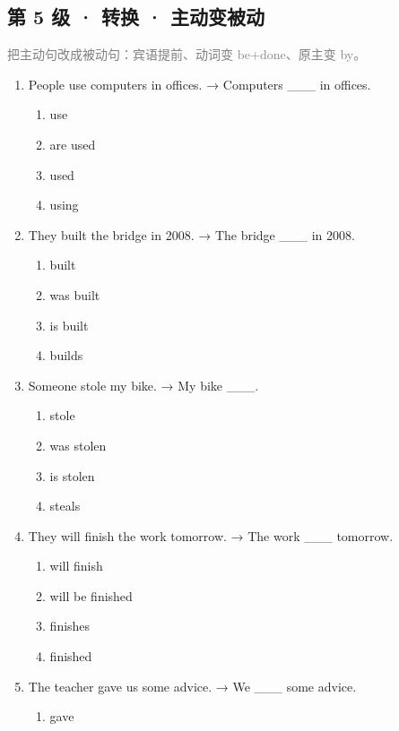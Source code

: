 \documentclass[11pt,a4paper]{ctexart}
\begin{document}
\subsection*{第 5 级 · 转换 · 主动变被动}
\noindent\textcolor{gray}{把主动句改成被动句：宾语提前、动词变 be+done、原主变 by。}\par\smallskip
\begin{enumerate}[leftmargin=*,itemsep=4pt]
\item People use computers in offices. → Computers \_\_\_ in offices.
\begin{enumerate}[label=\Alph*.,leftmargin=2em,itemsep=1pt,topsep=2pt]
\item use
\item are used
\item used
\item using
\end{enumerate}
\item They built the bridge in 2008. → The bridge \_\_\_ in 2008.
\begin{enumerate}[label=\Alph*.,leftmargin=2em,itemsep=1pt,topsep=2pt]
\item built
\item was built
\item is built
\item builds
\end{enumerate}
\item Someone stole my bike. → My bike \_\_\_.
\begin{enumerate}[label=\Alph*.,leftmargin=2em,itemsep=1pt,topsep=2pt]
\item stole
\item was stolen
\item is stolen
\item steals
\end{enumerate}
\item They will finish the work tomorrow. → The work \_\_\_ tomorrow.
\begin{enumerate}[label=\Alph*.,leftmargin=2em,itemsep=1pt,topsep=2pt]
\item will finish
\item will be finished
\item finishes
\item finished
\end{enumerate}
\item The teacher gave us some advice. → We \_\_\_ some advice.
\begin{enumerate}[label=\Alph*.,leftmargin=2em,itemsep=1pt,topsep=2pt]
\item gave

\end{enumerate}
\end{enumerate}
\end{document}
